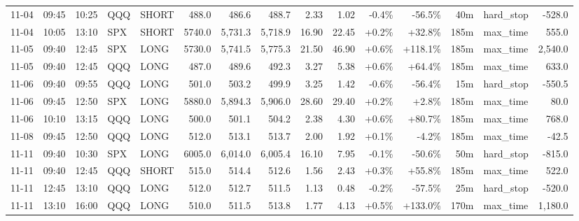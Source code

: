 \documentclass[11pt,a4paper,twoside]{article}
\begin{document}
\begin{landscape}
\begin{center}
\begin{longtable}{>{\color{txtmain}}l l l l l r r r r r r r r >{\color{txtmain}}l r}
11-04 & 09:45 & 10:25 & QQQ & SHORT & 488.0 & 486.6 & 488.7 & 2.33 & 1.02 & \textcolor{lossred}{-0.4\%} & \textcolor{lossred}{-56.5\%} & 40m & hard\_stop & \textcolor{lossred}{-528.0} \\
11-04 & 10:05 & 13:10 & SPX & SHORT & 5740.0 & 5,731.3 & 5,718.9 & 16.90 & 22.45 & \textcolor{wingreen}{+0.2\%} & \textcolor{wingreen}{+32.8\%} & 185m & max\_time & \textcolor{wingreen}{555.0} \\
11-05 & 09:40 & 12:45 & SPX & LONG & 5730.0 & 5,741.5 & 5,775.3 & 21.50 & 46.90 & \textcolor{wingreen}{+0.6\%} & \textcolor{wingreen}{+118.1\%} & 185m & max\_time & \textcolor{wingreen}{2,540.0} \\
11-05 & 09:40 & 12:45 & QQQ & LONG & 487.0 & 489.6 & 492.3 & 3.27 & 5.38 & \textcolor{wingreen}{+0.6\%} & \textcolor{wingreen}{+64.4\%} & 185m & max\_time & \textcolor{wingreen}{633.0} \\
11-06 & 09:40 & 09:55 & QQQ & LONG & 501.0 & 503.2 & 499.9 & 3.25 & 1.42 & \textcolor{lossred}{-0.6\%} & \textcolor{lossred}{-56.4\%} & 15m & hard\_stop & \textcolor{lossred}{-550.5} \\
11-06 & 09:45 & 12:50 & SPX & LONG & 5880.0 & 5,894.3 & 5,906.0 & 28.60 & 29.40 & \textcolor{wingreen}{+0.2\%} & \textcolor{wingreen}{+2.8\%} & 185m & max\_time & \textcolor{wingreen}{80.0} \\
11-06 & 10:10 & 13:15 & QQQ & LONG & 500.0 & 501.1 & 504.2 & 2.38 & 4.30 & \textcolor{wingreen}{+0.6\%} & \textcolor{wingreen}{+80.7\%} & 185m & max\_time & \textcolor{wingreen}{768.0} \\
11-08 & 09:45 & 12:50 & QQQ & LONG & 512.0 & 513.1 & 513.7 & 2.00 & 1.92 & \textcolor{wingreen}{+0.1\%} & \textcolor{lossred}{-4.2\%} & 185m & max\_time & \textcolor{lossred}{-42.5} \\
11-11 & 09:40 & 10:30 & SPX & LONG & 6005.0 & 6,014.0 & 6,005.4 & 16.10 & 7.95 & \textcolor{lossred}{-0.1\%} & \textcolor{lossred}{-50.6\%} & 50m & hard\_stop & \textcolor{lossred}{-815.0} \\
11-11 & 09:40 & 12:45 & QQQ & SHORT & 515.0 & 514.4 & 512.6 & 1.56 & 2.43 & \textcolor{wingreen}{+0.3\%} & \textcolor{wingreen}{+55.8\%} & 185m & max\_time & \textcolor{wingreen}{522.0} \\
11-11 & 12:45 & 13:10 & QQQ & LONG & 512.0 & 512.7 & 511.5 & 1.13 & 0.48 & \textcolor{lossred}{-0.2\%} & \textcolor{lossred}{-57.5\%} & 25m & hard\_stop & \textcolor{lossred}{-520.0} \\
11-11 & 13:10 & 16:00 & QQQ & LONG & 510.0 & 511.5 & 513.8 & 1.77 & 4.13 & \textcolor{wingreen}{+0.5\%} & \textcolor{wingreen}{+133.0\%} & 170m & max\_time & \textcolor{wingreen}{1,180.0} \\

\end{longtable}
\end{center}
\end{landscape}
\end{document}

